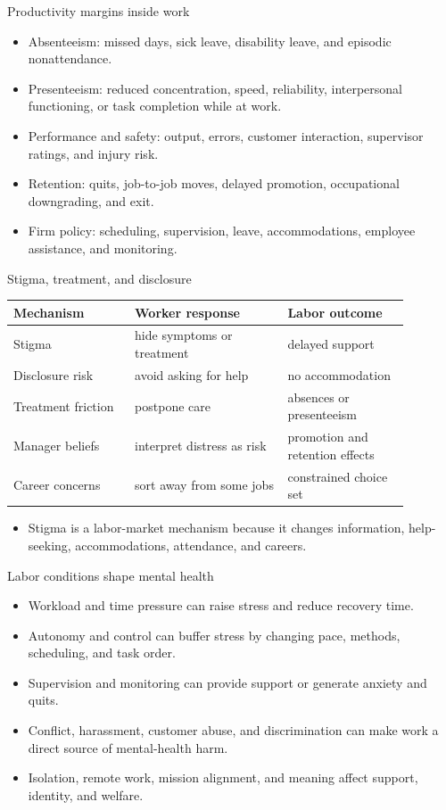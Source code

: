\documentclass[aspectratio=169,11pt]{beamer}
\begin{document}
\begin{frame}{Productivity margins inside work}
\begin{itemize}
    \item Absenteeism: missed days, sick leave, disability leave, and episodic nonattendance.
    \item Presenteeism: reduced concentration, speed, reliability, interpersonal functioning, or task completion while at work.
    \item Performance and safety: output, errors, customer interaction, supervisor ratings, and injury risk.
    \item Retention: quits, job-to-job moves, delayed promotion, occupational downgrading, and exit.
    \item Firm policy: scheduling, supervision, leave, accommodations, employee assistance, and monitoring.
\end{itemize}
\end{frame}

\begin{frame}{Stigma, treatment, and disclosure}
\small
\begin{tabular}{p{0.27\linewidth} p{0.34\linewidth} p{0.27\linewidth}}
\toprule
Mechanism & Worker response & Labor outcome \\
\midrule
Stigma & hide symptoms or treatment & delayed support \\
Disclosure risk & avoid asking for help & no accommodation \\
Treatment friction & postpone care & absences or presenteeism \\
Manager beliefs & interpret distress as risk & promotion and retention effects \\
Career concerns & sort away from some jobs & constrained choice set \\
\bottomrule
\end{tabular}
\vspace{0.25cm}
\begin{itemize}
    \item Stigma is a labor-market mechanism because it changes information, help-seeking, accommodations, attendance, and careers.
\end{itemize}
\end{frame}

\begin{frame}{Labor conditions shape mental health}
\begin{itemize}
    \item Workload and time pressure can raise stress and reduce recovery time.
    \item Autonomy and control can buffer stress by changing pace, methods, scheduling, and task order.
    \item Supervision and monitoring can provide support or generate anxiety and quits.
    \item Conflict, harassment, customer abuse, and discrimination can make work a direct source of mental-health harm.
    \item Isolation, remote work, mission alignment, and meaning affect support, identity, and welfare.
\end{itemize}
\end{frame}
\end{document}
